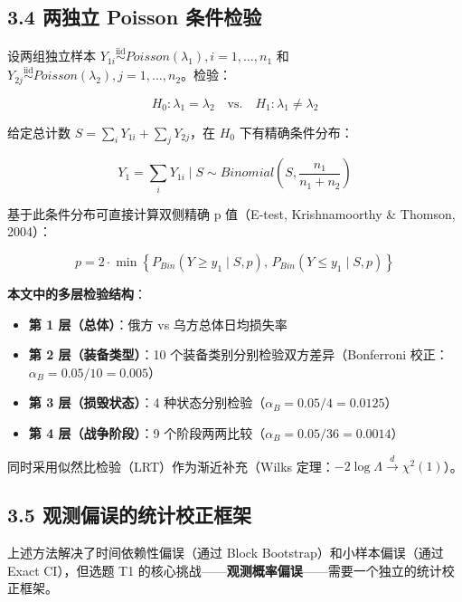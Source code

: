 \documentclass[
  a4paper,
  fontset=none,
]{ctexart}
\providecommand{\tightlist}{%
  \setlength{\itemsep}{0pt}\setlength{\parskip}{0pt}}
\begin{document}
\hypertarget{ux4e24ux72ecux7acb-poisson-ux6761ux4ef6ux68c0ux9a8c}{%
\subsection{3.4 两独立 Poisson
条件检验}\label{ux4e24ux72ecux7acb-poisson-ux6761ux4ef6ux68c0ux9a8c}}

设两组独立样本
\(Y_{1i} \overset{\text{iid}}{\sim} Poisson(\lambda_1), i=1,\ldots,n_1\)
和
\(Y_{2j} \overset{\text{iid}}{\sim} Poisson(\lambda_2), j=1,\ldots,n_2\)。检验：

\[
H_0: \lambda_1 = \lambda_2 \quad \text{vs.} \quad H_1: \lambda_1 \neq \lambda_2
\]

给定总计数 \(S = \sum_i Y_{1i} + \sum_j Y_{2j}\)，在 \(H_0\)
下有精确条件分布：

\[
Y_1 = \sum_i Y_{1i} \mid S \sim Binomial\left(S, \frac{n_1}{n_1 + n_2}\right)
\]

基于此条件分布可直接计算双侧精确 p 值（E-test, Krishnamoorthy \&
Thomson, 2004）：

\[
p = 2 \cdot \min\left\{P_{Bin}(Y \geq y_1 \mid S, p), \, P_{Bin}(Y \leq y_1 \mid S, p)\right\}
\]

\textbf{本文中的多层检验结构}：

\begin{itemize}
\tightlist
\item
  \textbf{第 1 层（总体）}：俄方 vs 乌方总体日均损失率
\item
  \textbf{第 2 层（装备类型）}：10
  个装备类别分别检验双方差异（Bonferroni
  校正：\(\alpha_B = 0.05/10 = 0.005\)）
\item
  \textbf{第 3 层（损毁状态）}：4
  种状态分别检验（\(\alpha_B = 0.05/4 = 0.0125\)）
\item
  \textbf{第 4 层（战争阶段）}：9
  个阶段两两比较（\(\alpha_B = 0.05/36 = 0.0014\)）
\end{itemize}

同时采用似然比检验（LRT）作为渐近补充（Wilks
定理：\(-2\log\Lambda \xrightarrow{d} \chi^2(1)\)）。

\hypertarget{ux89c2ux6d4bux504fux8befux7684ux7edfux8ba1ux6821ux6b63ux6846ux67b6}{%
\subsection{3.5
观测偏误的统计校正框架}\label{ux89c2ux6d4bux504fux8befux7684ux7edfux8ba1ux6821ux6b63ux6846ux67b6}}

上述方法解决了时间依赖性偏误（通过 Block
Bootstrap）和小样本偏误（通过 Exact CI），但选题 T1
的核心挑战------\textbf{观测概率偏误}------需要一个独立的统计校正框架。
\end{document}
